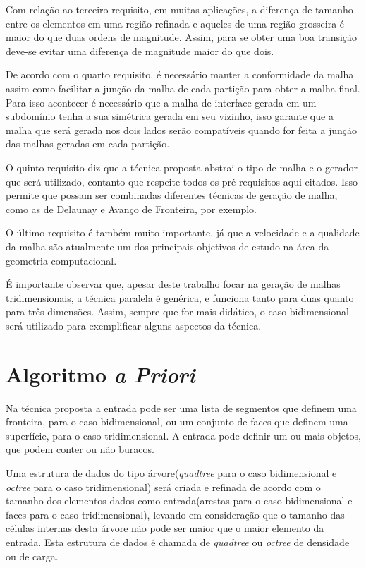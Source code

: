 Com relação ao terceiro requisito, em muitas aplicações, a diferença de tamanho entre os elementos em uma região refinada e aqueles de uma região grosseira é maior do que duas ordens de magnitude. Assim, para se obter uma boa transição deve-se evitar uma diferença de magnitude maior do que dois.

De acordo com o quarto requisito, é necessário manter a conformidade da malha assim como facilitar a junção da malha de cada partição para obter a malha final. Para isso acontecer é necessário que a malha de interface gerada em um subdomínio tenha a sua simétrica gerada em seu vizinho, isso garante que a malha que será gerada nos dois lados serão compatíveis quando for feita a junção das malhas geradas em cada partição.

O quinto requisito diz que a técnica proposta abstrai o tipo de malha e o gerador que será utilizado, contanto que respeite todos os pré-requisitos aqui citados. Isso permite que possam ser combinadas diferentes técnicas de geração de malha, como as de Delaunay e Avanço de Fronteira, por exemplo.

O último requisito é também muito importante, já que a velocidade e a qualidade da malha são atualmente um dos principais objetivos de estudo na área da geometria computacional.

É importante observar que, apesar deste trabalho focar na geração de malhas tridimensionais, a técnica paralela é genérica, e funciona tanto para duas quanto para três dimensões. Assim, sempre que for mais didático, o caso bidimensional será utilizado para exemplificar alguns aspectos da técnica.



\section{Algoritmo \textit{a Priori}}

Na técnica proposta a entrada pode ser uma lista de segmentos que definem uma fronteira, para o caso bidimensional, ou um conjunto de faces que definem uma superfície, para o caso tridimensional. A entrada pode definir um ou mais objetos, que podem conter ou não buracos. 

Uma estrutura de dados do tipo árvore(\textit{quadtree} para o caso bidimensional e \textit{octree} para o caso tridimensional) será criada e refinada de acordo com o tamanho dos elementos dados como entrada(arestas para o caso bidimensional e faces para o caso tridimensional), levando em consideração que o tamanho das células internas desta árvore não pode ser maior que o maior elemento da entrada. Esta estrutura de dados é chamada de \textit{quadtree} ou \textit{octree} de densidade ou de carga.

